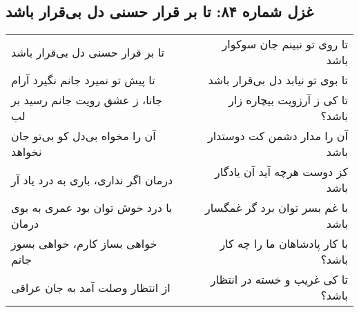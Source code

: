 \begin{center}
\section*{غزل شماره ۸۴: تا بر قرار حسنی دل بی‌قرار باشد}
\label{sec:084}
\begin{longtable}{l p{0.5cm} r}
تا بر قرار حسنی دل بی‌قرار باشد
&&
تا روی تو نبینم جان سوکوار باشد
\\
تا پیش تو نمیرد جانم نگیرد آرام
&&
تا بوی تو نیابد دل بی‌قرار باشد
\\
جانا، ز عشق رویت جانم رسید بر لب
&&
تا کی ز آرزویت بیچاره زار باشد؟
\\
آن را مخواه بی‌دل کو بی‌تو جان نخواهد
&&
آن را مدار دشمن کت دوستدار باشد
\\
درمان اگر نداری، باری به درد یاد آر
&&
کز دوست هرچه آید آن یادگار باشد
\\
با درد خوش توان بود عمری به بوی درمان
&&
با غم بسر توان برد گر غمگسار باشد
\\
خواهی بساز کارم، خواهی بسوز جانم
&&
با کار پادشاهان ما را چه کار باشد؟
\\
از انتظار وصلت آمد به جان عراقی
&&
تا کی غریب و خسته در انتظار باشد؟
\\
\end{longtable}
\end{center}

